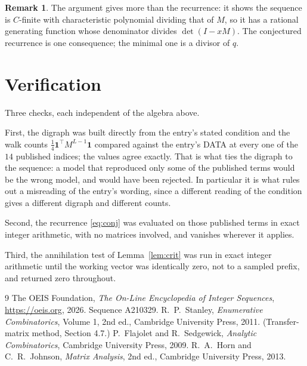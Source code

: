 \documentclass[11pt,a4paper]{article}
\theoremstyle{plain}
\theoremstyle{definition}
\newtheorem{remark}[theorem]{Remark}
\begin{document}
\begin{remark}
The argument gives more than the recurrence: it shows the sequence is $C$-finite with
characteristic polynomial dividing that of $M$, so it has a rational generating function
whose denominator divides $\det(I-xM)$. The conjectured recurrence is one consequence; the
minimal one is a divisor of $q$.
\end{remark}

\section{Verification}

Three checks, each independent of the algebra above.

First, the digraph was built directly from the entry's stated condition and the walk counts
$\tfrac1{4}\mathbf{1}^{\!\top}M^{L-1}\mathbf{1}$ compared against the entry's DATA at
every one of the $14$ published indices; the values agree exactly. That is what ties
the digraph to the sequence: a model that reproduced only some of the published terms would
be the wrong model, and would have been rejected. In particular it is what rules out a
misreading of the entry's wording, since a different reading of the condition gives a
different digraph and different counts.

Second, the recurrence \eqref{eq:conj} was evaluated on those published terms in exact
integer arithmetic, with no matrices involved, and vanishes wherever it applies.

Third, the annihilation test of Lemma~\ref{lem:crit} was run in exact integer arithmetic
until the working vector was identically zero, not to a sampled prefix, and returned zero
throughout.

\begin{thebibliography}{9}
 The OEIS Foundation, \emph{The On-Line Encyclopedia of Integer
Sequences}, \url{https://oeis.org}, 2026. Sequence A210329.
 R.~P.~Stanley, \emph{Enumerative Combinatorics}, Volume 1, 2nd ed.,
Cambridge University Press, 2011. (Transfer-matrix method, Section 4.7.)
 P.~Flajolet and R.~Sedgewick, \emph{Analytic Combinatorics}, Cambridge
University Press, 2009.
 R.~A.~Horn and C.~R.~Johnson, \emph{Matrix Analysis}, 2nd ed., Cambridge
University Press, 2013.
\end{thebibliography}
\end{document}
